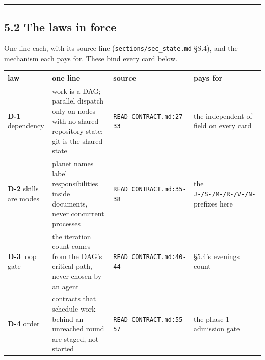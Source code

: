 \documentclass[11pt,a4paper]{article}
\newcounter{none}                 %
\theoremstyle{plain}
\theoremstyle{definition}
\theoremstyle{remark}
\begin{document}
\begin{center}\rule{0.5\linewidth}{0.5pt}\end{center}

\subsection{5.2 The laws in force}\label{the-laws-in-force}

One line each, with its source line (\texttt{sections/sec\_state.md}
§S.4), and the mechanism each pays for. These bind every card below.

{\def\LTcaptype{none} %
\begin{longtable}[]{@{}
  >{\raggedright\arraybackslash}p{}
  >{\raggedright\arraybackslash}p{}
  >{\raggedright\arraybackslash}p{}
  >{\raggedright\arraybackslash}p{}@{}}
\toprule\noalign{}
\begin{minipage}[b]{\linewidth}\raggedright
law
\end{minipage} & \begin{minipage}[b]{\linewidth}\raggedright
one line
\end{minipage} & \begin{minipage}[b]{\linewidth}\raggedright
source
\end{minipage} & \begin{minipage}[b]{\linewidth}\raggedright
pays for
\end{minipage} \\
\midrule\noalign{}
\endhead
\bottomrule\noalign{}
\endlastfoot
\textbf{D-1} dependency & work is a DAG; parallel dispatch only on nodes
with no shared repository state; git is the shared state &
\texttt{READ\ CONTRACT.md:27-33} & the independent-of field on every
card \\
\textbf{D-2} skills are modes & planet names label responsibilities
inside documents, never concurrent processes &
\texttt{READ\ CONTRACT.md:35-38} & the \texttt{J-/S-/M-/R-/V-/N-}
prefixes here \\
\textbf{D-3} loop gate & the iteration count comes from the DAG's
critical path, never chosen by an agent &
\texttt{READ\ CONTRACT.md:40-44} & §5.4's evenings count \\
\textbf{D-4} order & contracts that schedule work behind an unreached
round are staged, not started & \texttt{READ\ CONTRACT.md:55-57} & the
phase-1 admission gate \\

\end{longtable}}
\end{document}
